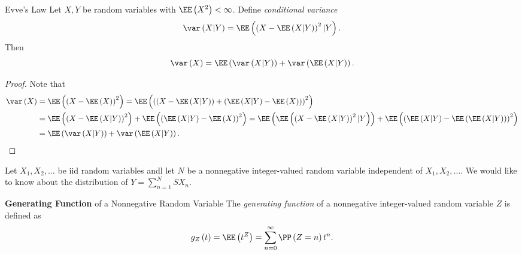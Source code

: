 \documentclass[stat901]{subfiles}
\begin{document}
    \begin{cor}{Evve's Law}
        Let $X,Y$ be random variables with $\EE\left( X^{2} \right)<\infty$. Define \emph{conditional variance}
        \begin{equation*}
            \var\left( X|Y \right) = \EE\left( \left( X-\EE\left( X|Y \right) \right)^{2}|Y \right).
        \end{equation*}
        Then
        \begin{equation*}
            \var\left( X \right) = \EE\left( \var\left( X|Y \right) \right) + \var\left( \EE\left( X|Y \right) \right).
        \end{equation*}
    \end{cor}	

    \begin{proof}
        Note that
        \begin{align*}
            \var\left( X \right) & = \EE\left( \left( X-\EE\left( X \right) \right)^{2} \right) = \EE\left( \left( \left( X-\EE\left( X|Y \right) \right) + \left( \EE\left( X|Y \right)-\EE\left( X \right) \right) \right)^{2} \right) \\
                                 & = \EE\left( \left( X-\EE\left( X|Y \right) \right)^{2} \right) + \EE\left( \left( \EE\left( X|Y \right)-\EE\left( X \right) \right)^{2} \right) = \EE\left( \EE\left( \left( X-\EE\left( X|Y \right) \right)^{2}|Y \right) \right) + \EE\left( \left( \EE\left( X|Y \right)-\EE\left( \EE\left( X|Y \right) \right) \right)^{2} \right) \\
                                 & = \EE\left( \var\left( X|Y \right) \right) + \var\left( \EE\left( X|Y \right) \right).
        \end{align*} 
    \end{proof}
    
    \np Let $X_1,X_2,\ldots$ be iid random variables andl let $N$ be a nonnegative integer-valued random variable independent of $X_1,X_2,\ldots$. We would like to know about the distribution of $Y = \sum^{N}_{n=1} SX_n$.

    \begin{definition}{\textbf{Generating Function} of a Nonnegative Random Variable}
        The \emph{generating function} of a nonnegative integer-valued random variable $Z$ is defined as
        \begin{equation*}
            g_Z\left( t \right) = \EE\left( t^Z \right) = \sum^{\infty}_{n=0} \PP\left( Z=n \right)t^n.
        \end{equation*}
    \end{definition}
\end{document}
